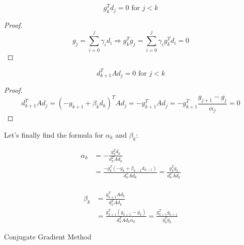 \begin{theorem}
    \[
        g_k^T d_j = 0 \text{ for } j < k
    \]
\end{theorem}
\begin{proof}
    \[ 
        g_j = \sum^{j}_{i=0} \gamma_i d_i \Longrightarrow g_k^T g_j = \sum^{j}_{i=0} \gamma_i g_k^T d_i = 0
    \]
\end{proof}

\begin{theorem}
    \[
        d_{k+1}^T A d_j = 0 \text{ for } j < k
    \]
\end{theorem}
\begin{proof}
    \[ 
        d_{k+1}^T A d_j = (-g_{k+1} + \beta_k d_k)^T A d_j = -g_{k+1}^T A d_j = -g_{k+1}^T \frac{g_{j+1} - g_j}{\alpha_j} = 0
    \]
\end{proof}

Let's finally find the formula for $\alpha_k$ and $\beta_k$: 

\begin{align*}
    \alpha_k &= - \frac{g_k^T d_k}{d_k^T A d_k} \\ 
    &= \frac{-g_k^T (-g_k + \beta_{k-1} d_{k-1})}{d_k^T A d_k}
    = \boxed{\frac{g_k^T g_k}{d_k^T A d_k}} \\ 
\end{align*}

\begin{align*}
    \beta_k &= \frac{g_{k+1}^T A d_k}{d_k^T A d_k} \\ 
    &= \frac{g_{k+1}^T (g_{k+1} - g_k)}{d_k^T A d_k \alpha_k} = \boxed{\frac{g_{k+1}^T g_{k+1}}{g_k^T g_k}}
\end{align*}

\begin{algorithm}
    \caption{Conjugate Gradient Method}
    \begin{algorithmic}[1]
        \EndIf
    \EndFor
    \end{algorithmic}
\end{algorithm}

